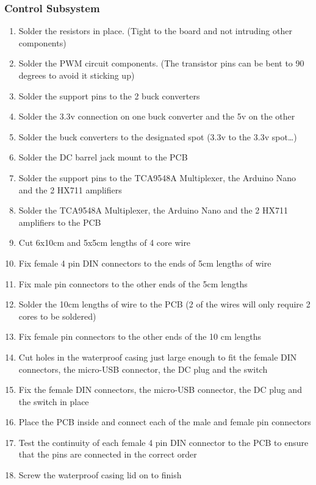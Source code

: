 \subsubsection{Control Subsystem}

\begin{enumerate}
    \item Solder the resistors in place. (Tight to the board and not intruding other components)
    \item Solder the PWM circuit components. (The transistor pins can be bent to 90 degrees to avoid it sticking up) 
    \item Solder the support pins to the 2 buck converters
    \item Solder the 3.3v connection on one buck converter and the 5v on the other
    \item Solder the buck converters to the designated spot (3.3v to the 3.3v spot…)
    \item Solder the DC barrel jack mount to the PCB
    \item Solder the support pins to the TCA9548A Multiplexer, the Arduino Nano and the 2 HX711 amplifiers
    \item Solder the TCA9548A Multiplexer, the Arduino Nano and the 2 HX711 amplifiers to the PCB
    \item Cut 6x10cm and 5x5cm lengths of 4 core wire
    \item Fix female 4 pin DIN connectors to the ends of 5cm lengths of wire
    \item Fix male pin connectors to the other ends of the 5cm lengths
    \item Solder the 10cm lengths of wire to the PCB (2 of the wires will only require 2 cores to be soldered)
    \item Fix female pin connectors to the other ends of the 10 cm lengths
    \item Cut holes in the waterproof casing just large enough to fit the female DIN connectors, the micro-USB connector, the DC plug and the switch
    \item Fix the female DIN connectors, the micro-USB connector, the DC plug and the switch in place
    \item Place the PCB inside and connect each of the male and female pin connectors
    \item Test the continuity of each female 4 pin DIN connector to the PCB to ensure that the pins are connected in the correct order
    \item Screw the waterproof casing lid on to finish

  \end{enumerate}

